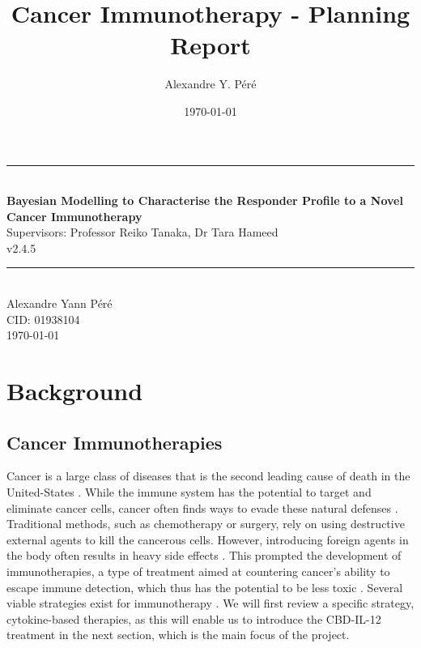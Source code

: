\documentclass[11pt]{article}
\title{Cancer Immunotherapy - Planning Report}
\author{Alexandre Y. Péré }
\date{\today}
\begin{document}
\begin{titlepage}
    \newcommand{\HRule}{\rule{\linewidth}{0.5mm}}
    \begin{center}
        \HRule \\[0.4cm]
    { \LARGE \bfseries Bayesian Modelling to Characterise the Responder Profile to a  Novel Cancer Immunotherapy\\[0.55cm] }
    { \large Supervisors: Professor Reiko Tanaka, Dr Tara Hameed} \\
    v2.4.5
    \\[0.4cm]
    \HRule \\[0.5cm]
    { \large Alexandre Yann Péré \\[0.1cm]
    CID: 01938104  \\[0.1cm]
    \today \\ [0.1cm]
    \vspace{10pt}}
    \end{center}
\end{titlepage}

\tableofcontents

\pagebreak 
\section{Background}\label{sec:specs}

\subsection{Cancer Immunotherapies}\label{sec:cancer}
Cancer is a large class of diseases that is the second leading cause of death in the United-States \cite{nchs}. While the immune system has the potential to target and eliminate cancer cells, cancer often finds ways to evade these natural defenses \cite{EvasionMech}. Traditional methods, such as chemotherapy or surgery, rely on using destructive external agents to kill the cancerous cells. However, introducing foreign agents in the body often results in heavy side effects \cite{oncologyTreatRev}. This prompted the development of immunotherapies, a type of treatment aimed at countering cancer's ability to escape immune detection, which thus has the potential to be less toxic \cite{toxicImmuno}. Several viable strategies exist for immunotherapy \cite{ReviewCPI}. We will first review a specific strategy, cytokine-based therapies, as this will enable us to introduce the CBD-IL-12 treatment in the next section, which is the main focus of the project.
\end{document}
